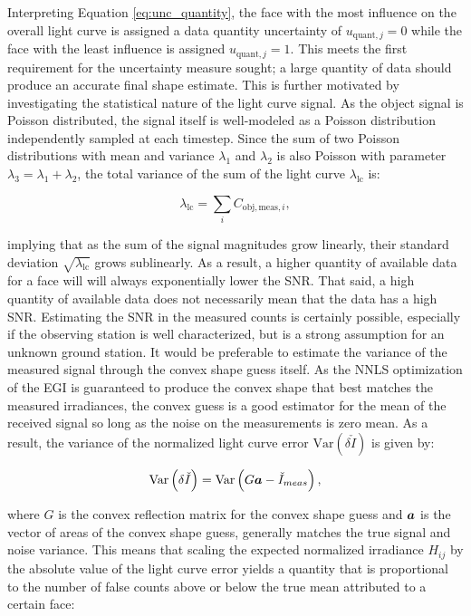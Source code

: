 Interpreting Equation \ref{eq:unc_quantity}, the face with the most influence on the overall light curve is assigned a data quantity uncertainty of $u_{\mathrm{quant},j} = 0$ while the face with the least influence is assigned $u_{\mathrm{quant},j} = 1$. This meets the first requirement for the uncertainty measure sought; a large quantity of data should produce an accurate final shape estimate. This is further motivated by investigating the statistical nature of the light curve signal. As the object signal is Poisson distributed, the signal itself is well-modeled as a Poisson distribution independently sampled at each timestep. Since the sum of two Poisson distributions with mean and variance $\lambda_1$ and $\lambda_2$ is also Poisson with parameter $\lambda_3 = \lambda_1 + \lambda_2$, the total variance of the sum of the light curve $\lambda_\mathrm{lc}$ is:

\begin{equation}
  \lambda_\mathrm{lc} = \sum_{i} C_{\mathrm{obj},\mathrm{meas},i},
\end{equation}

implying that as the sum of the signal magnitudes grow linearly, their standard deviation $\sqrt{\lambda_\mathrm{lc}}$ grows sublinearly. As a result, a higher quantity of available data for a face will will always exponentially lower the SNR. That said, a high quantity of available data does not necessarily mean that the data has a high SNR. Estimating the SNR in the measured counts is certainly possible, especially if the observing station is well characterized, but is a strong assumption for an unknown ground station. It would be preferable to estimate the variance of the measured signal through the convex shape guess itself. As the NNLS optimization of the EGI is guaranteed to produce the convex shape that best matches the measured irradiances, the convex guess is a good estimator for the mean of the received signal so long as the noise on the measurements is zero mean. As a result, the variance of the normalized light curve error $\mathrm{Var}\left(\delta \check{I}\right)$ is given by:

\begin{equation}
  \mathrm{Var}\left(\delta \check{I}\right) = \mathrm{Var}\left(G \bm{a} - \check{I}_{meas}\right),
\end{equation}

where $G$ is the convex reflection matrix for the convex shape guess and $\bm{a}$ is the vector of areas of the convex shape guess, generally matches the true signal and noise variance. This means that scaling the expected normalized irradiance $H_{ij}$ by the absolute value of the light curve error yields a quantity that is proportional to the number of false counts above or below the true mean attributed to a certain face:

